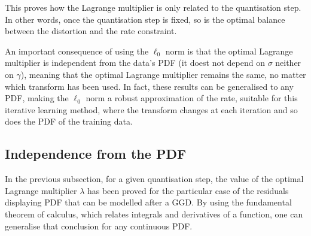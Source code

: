 \documentclass[11pt,a4paper,openright,twoside]{book}
\numberwithin{equation}{section} %
\begin{document}
This proves how the Lagrange multiplier is only related to the
quantisation step.
In other words, once the quantisation step is fixed, so is the optimal
balance between the distortion and the rate constraint.

An important consequence of using the $\ell_0$ norm is that the optimal
Lagrange multiplier is independent from the data's \ac{PDF} (it doest
not depend on $\sigma$ neither on $\gamma$), meaning that the optimal
Lagrange multiplier remains the same, no matter which transform has been
used.
In fact, these results can be generalised to any \ac{PDF}, making the
$\ell_0$ norm a robust approximation of the rate, suitable for this
iterative learning method, where the transform changes at each iteration
and so does the \ac{PDF} of the training data.

\subsection{Independence from the \ac{PDF}}
\label{sub:independence_from_the_pdf}

In the previous subsection, for a given quantisation step, the value of
the optimal Lagrange multiplier $\lambda$ has been proved for the
particular case of the residuals displaying \ac{PDF} that can be
modelled after a \ac{GGD}.
By using the fundamental theorem of calculus, which relates integrals
and derivatives of a function, one can generalise that conclusion for
any continuous \ac{PDF}.
\end{document}
